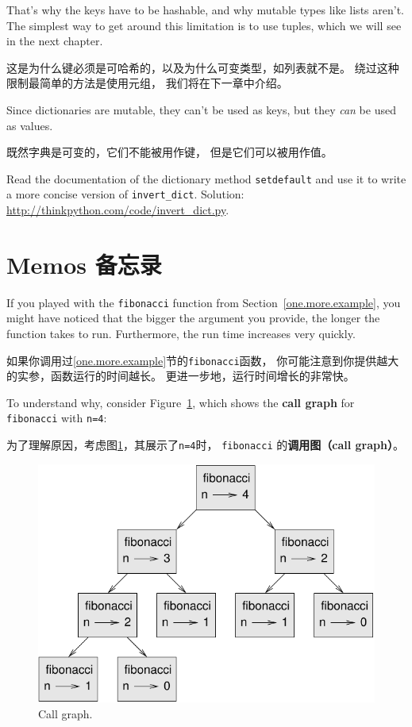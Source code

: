 \documentclass[10pt]{book}
\begin{document}
\begin{CJK}{UTF8}{gbsn}
That's why the keys have to be hashable, and why mutable types like
lists aren't.  The simplest way to get around this limitation is to
use tuples, which we will see in the next chapter.

这是为什么键必须是可哈希的，以及为什么可变类型，如列表就不是。
绕过这种限制最简单的方法是使用元组，
我们将在下一章中介绍。

Since dictionaries are mutable, they can't be used as keys,
but they {\em can} be used as values.

既然字典是可变的，它们不能被用作键，
但是它们可以被用作值。

\begin{exercise}
Read the documentation of the dictionary method {\tt setdefault}
and use it to write a more concise version of \verb"invert_dict".
Solution: \url{http://thinkpython.com/code/invert_dict.py}.

\end{exercise}


\section{Memos 备忘录}

If you played with the {\tt fibonacci} function from
Section~\ref{one.more.example}, you might have noticed that the bigger
the argument you provide, the longer the function takes to run.
Furthermore, the run time increases very quickly.

如果你调用过\ref{one.more.example}节的{\tt fibonacci}函数，
你可能注意到你提供越大的实参，函数运行的时间越长。
更进一步地，运行时间增长的非常快。

To understand why, consider Figure~\ref{fig.fibonacci}, which shows
the {\bf call graph} for {\tt fibonacci} with {\tt n=4}:

为了理解原因，考虑图\ref{fig.fibonacci}，其展示了{\tt n=4}时，
{\tt fibonacci} 的{\bf 调用图（call graph）}。

\begin{figure}
\centerline
{\includegraphics[scale=0.7]{figs/fibonacci.pdf}}
\caption{Call graph.}
\label{fig.fibonacci}
\end{figure}


\end{CJK}
\end{document}
